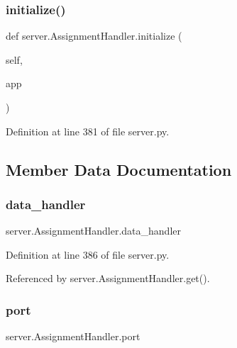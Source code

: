 \subsubsection{\texorpdfstring{initialize()}{initialize()}}
{\footnotesize\ttfamily def server.\+Assignment\+Handler.\+initialize (\begin{DoxyParamCaption}\item[{}]{self,  }\item[{}]{app }\end{DoxyParamCaption})}



Definition at line 381 of file server.\+py.



\subsection{Member Data Documentation}
\mbox{\label{classserver_1_1AssignmentHandler_a0aa25cd2a38359cd2dc7083ec5990228}} 
\subsubsection{\texorpdfstring{data\+\_\+handler}{data\_handler}}
{\footnotesize\ttfamily server.\+Assignment\+Handler.\+data\+\_\+handler}



Definition at line 386 of file server.\+py.



Referenced by server.\+Assignment\+Handler.\+get().

\mbox{\label{classserver_1_1AssignmentHandler_ab199120f94601a0e4a221aa154a76da1}} 
\subsubsection{\texorpdfstring{port}{port}}
{\footnotesize\ttfamily server.\+Assignment\+Handler.\+port}



